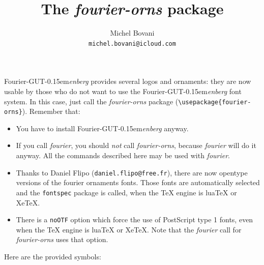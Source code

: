 \documentclass[a4paper,11pt]{article}
\title{\floweroneleft{}\,The \emph{fourier-orns} package\,\floweroneright}
\author{Michel Bovani\\\texttt{michel.bovani@icloud.com}}
\newcommand{\fourier}{Fourier-GUT\kern-0.15em\textit{enberg}}
\begin{document}
\sloppy
\maketitle

\fourier{} provides several logos and ornaments: they are now usable by those who do not want to use
the \fourier{} font system. In this case, just call the \textit{fourier-orns} package (\verb=\usepackage{fourier-orns}=).
Remember that:
\begin{itemize}
\item You have to install \fourier{} anyway.
\item If you call \textit{fourier}, you should \emph{not} call \textit{fourier-orns}, because \textit{fourier} will do it anyway.
All the commands described here may be used with \textit{fourier}.
\item Thanks to Daniel Flipo (\texttt{daniel.flipo@free.fr}), there are now opentype versions of the fourier ornaments fonts. Those fonts are automatically selected and the \texttt{fontspec} package is called, when the \TeX{} engine is lua\TeX{} or Xe\TeX{}.
\item There is a \texttt{noOTF} option which force the use of PostScript type 1 fonts, even when the \TeX{} engine is lua\TeX{} or Xe\TeX{}. Note that the \textit{fourier} call for \textit{fourier-orns} uses that option.
\end{itemize}

\bigskip

Here are the provided symbols:
\end{document}
